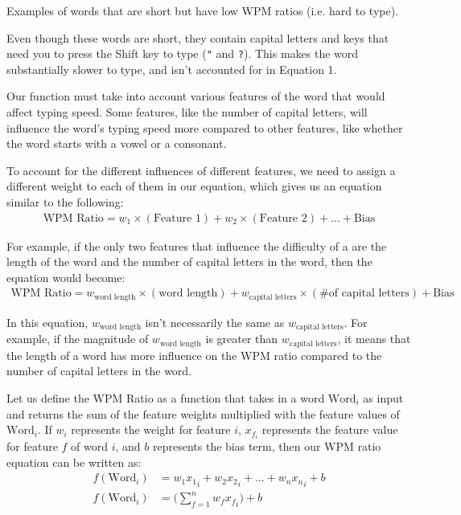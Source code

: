 \documentclass[12pt, demo]{article}
\newcommand{\code}[1]{\texttt{#1}}
\begin{document}
\begin{table}
	\caption{Examples of words that are short but have low WPM ratios (i.e. hard to type).}
\end{table}

Even though these words are short, they contain capital letters and keys that need you to press the Shift key to type (\code{"} and \code{?}). This makes the word substantially slower to type, and isn't accounted for in Equation 1.

Our function must take into account various features of the word that would affect typing speed. Some features, like the number of capital letters, will influence the word's typing speed more compared to other features, like whether the word starts with a vowel or a consonant.

To account for the different influences of different features, we need to assign a different weight to each of them in our equation, which gives us an equation similar to the following:
\begin{align*}
	\text{WPM Ratio} = w_1 \times (\text{Feature 1}) + w_2 \times (\text{Feature 2}) + \dots + \text{Bias}
\end{align*}

For example, if the only two features that influence the difficulty of a are the length of the word and the number of capital letters in the word, then the equation would become:
\begin{align*}
	\text{WPM Ratio} = w_{\text{word length}} \times (\text{word length}) + w_{\text{capital letters}} \times (\text{\# of capital letters}) + \text{Bias}
\end{align*}

In this equation, $w_{\text{word length}}$ isn't necessarily the same as $w_{\text{capital letters}}$. For example, if the magnitude of $w_{\text{word length}}$ is greater than $w_{\text{capital letters}}$, it means that the length of a word has more influence on the WPM ratio compared to the number of capital letters in the word.

Let us define the WPM Ratio as a function that takes in a word $\text{Word}_i$ as input and returns the sum of the feature weights multiplied with the feature values of $\text{Word}_i$. If $w_i$ represents the weight for feature $i$, $x_{f_i}$ represents the feature value for feature $f$ of word $i$, and $b$ represents the bias term, then our WPM ratio equation can be written as:
\begin{align*}
	f(\text{Word}_i) & = w_1{x_1}_i + w_2{x_2}_i + \dots + w_n{x_n}_i + b
	\\
	f(\text{Word}_i) & = \Big(\sum_{f=1}^{n} w_f{x_f}_i\Big) + b
\end{align*}
\end{document}
